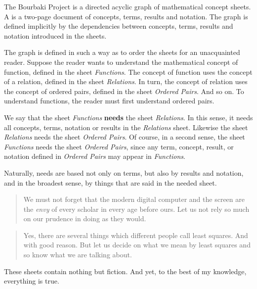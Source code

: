 
\sbasic

\sstart
{}

The Bourbaki Project is a directed acyclic graph of
mathematical concept sheets.
A  is a two-page document of
concepts, terms, results and notation.
The graph is defined implicitly by
the dependencies between concepts, terms,
results and notation introduced in the sheets.

The graph is defined in such a way as to
order the sheets for an unacquainted reader.
Suppose the reader wants to understand the
mathematical concept of function, defined
in the sheet \textit{Functions}.
The concept of function uses the concept of a
relation,
defined in the sheet \textit{Relations}.
In turn, the concept of relation uses the
concept of ordered pairs, defined in
the sheet \textit{Ordered Pairs}.
And so on.
To understand functions, the reader must
first understand ordered pairs.

We say that the sheet \textit{Functions}
\textbf{needs} the sheet \textit{Relations}.
In this sense, it needs all concepts,
terms, notation or results in the
\textit{Relations} sheet.
Likewise the sheet \textit{Relations}
needs the sheet \textit{Ordered Pairs}.
Of course, in a second sense, the sheet
\textit{Functions} needs the sheet
\textit{Ordered Pairs},
since any term, concept,
result, or notation defined in
\textit{Ordered Pairs} may appear in
\textit{Functions}.

Naturally, needs are based not only
on terms, but also by results and notation,
and in the broadest sense, by things that are said in the
needed sheet.

\clearpage


\begin{quote}
We must not forget that the
modern digital computer and
the screen are the \textit{envy} of
every scholar in every age
before ours. Let us not rely
so much
on our prudence in doing
as they would.
\end{quote}

\begin{quote}
Yes, there are several things
which different people call
least squares. And with good
reason. But let us decide on
what we mean by least squares
and so know what we are talking
about.
\end{quote}

These sheets contain nothing
but fiction. And yet, to the best
of my knowledge, everything
is true.
\strats
